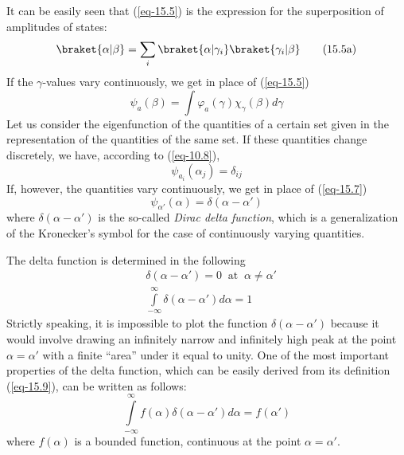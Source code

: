 \documentclass[a4paper,sfsidenotes,colorlinks=true]{tufte-book}
\numberwithin{equation}{section}
\numberwithin{figure}{section}
\begin{document}
It can be easily seen that (\ref{eq-15.5}) is the expression for the
 superposition of amplitudes of states:
\begin{equation}%
\braket{\alpha | \beta} = \sum_{i}\braket{\alpha | \gamma_{i}}\braket{\gamma_{i} | \beta}
\tag{15.5a}
\label{eq-15.5a}
\end{equation}
If the $\gamma$-values vary continuously, we get in place of
(\ref{eq-15.5}) 
\begin{equation}%
\psi_{a} (\beta) = \int \varphi_{a} (\gamma) \chi_{\gamma} (\beta) d \gamma
\label{eq-15.6}
\end{equation}
Let us consider the eigenfunction of the quantities of a certain set
given in the representation of the quantities of the same set. If
these quantities change discretely, we have, according to
(\ref{eq-10.8}),
\begin{equation}%
\psi_{a_{i}} (\alpha_{j}) = \delta_{ij}
\label{eq-15.7}
\end{equation}
If, however, the quantities vary continuously, we get in place of (\ref{eq-15.7}) 
\begin{equation}%
\psi_{\alpha'} (\alpha) = \delta (\alpha - \alpha')
\label{eq-15.8}
\end{equation}
where $\delta (\alpha - \alpha')$ is the so-called \emph{Dirac delta
function}, which is a generalization of the Kronecker's symbol for the
case of continuously varying quantities.

The delta function is determined in the following
\begin{equation}%
\begin{split}
& \delta (\alpha - \alpha') = 0 \;\; \textrm{at} \;\; \alpha \ne
\alpha'\\
& \int\limits_{-\infty}^\infty \delta (\alpha - \alpha') d \alpha = 1
 \end{split}
\label{eq-15.9} 
\end{equation}
Strictly speaking, it is impossible to plot the function $\delta
(\alpha - \alpha')$ because it would involve drawing an infinitely
narrow and infinitely high peak at the point $\alpha = \alpha'$ with a
finite ``area'' under it equal to unity. One of the most important
properties of the delta function, which can be easily derived from its
definition (\ref{eq-15.9}), can be written as follows:
\begin{equation}%
\int\limits_{-\infty}^\infty f (\alpha) \delta (\alpha - \alpha') d
\alpha = f (\alpha ')
\label{eq-15.10}
\end{equation}
where $f (\alpha)$ is a bounded function, continuous at the point
$\alpha = \alpha'$. 
\end{document}
